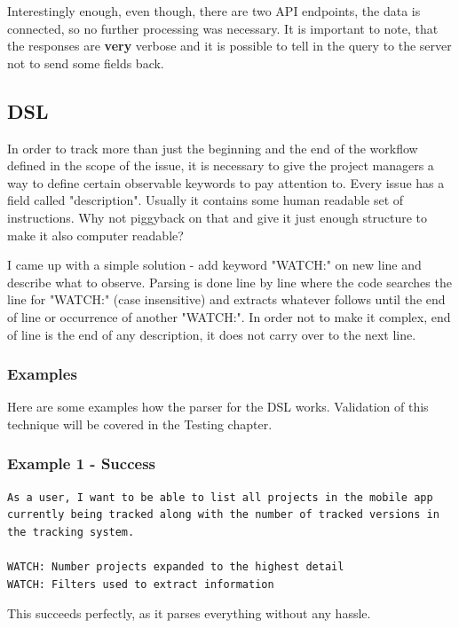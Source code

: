 Interestingly enough, even though, there are two API endpoints, the data is connected, so no further processing was necessary. It is important to note, that the responses are {\bf very} verbose and it is possible to tell in the query to the server not to send some fields back.

\subsection{DSL}

In order to track more than just the beginning and the end of the workflow defined in the scope of the issue, it is necessary to give the project managers a way to define certain observable keywords to pay attention to. Every issue has a field called "description". Usually it contains some human readable set of instructions. Why not piggyback on that and give it just enough structure to make it also computer readable?

I came up with a simple solution - add keyword "WATCH:" on new line and describe what to observe. Parsing is done line by line where the code searches the line for "WATCH:" (case insensitive) and extracts whatever follows until the end of line or occurrence of another "WATCH:". In order not to make it complex, end of line is the end of any description, it does not carry over to the next line.

\subsubsection{Examples}

Here are some examples how the parser for the DSL works. Validation of this technique will be covered in the Testing chapter.

\subsubsection*{Example 1 - Success}

\begin{lstlisting}
As a user, I want to be able to list all projects in the mobile app currently being tracked along with the number of tracked versions in the tracking system.

WATCH: Number projects expanded to the highest detail
WATCH: Filters used to extract information
\end{lstlisting}

This succeeds perfectly, as it parses everything without any hassle.

